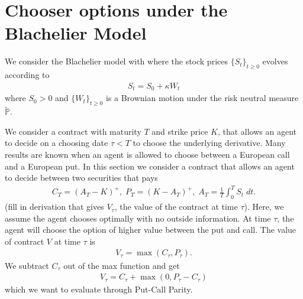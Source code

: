 \documentclass[reqno]{amsart}
\begin{document}
%
\begin{nouppercase}
\maketitle
\end{nouppercase}




\tableofcontents
\setcounter{part}{0}


\section{Chooser options under the Blachelier Model}
We consider the Blachelier model with where the stock prices $\{S_t\}_{t \ge 0}$ evolves according to 
\begin{align}
	 S_t = S_0 + \kappa W_t
\end{align}
where $S_0 > 0$ and $\{W_t\}_{t \ge 0}$ is a Brownian motion under the risk neutral measure $\tilde{\mathbb{P}}$.

We consider a contract with maturity $T$ and strike price $K$, that allows an agent to decide on a choosing date $\tau < T$ to choose the underlying derivative. Many results are known when an agent is allowed to choose between a European call and a European put. In this section we consider a contract that allows an agent to decide between two securities that pays 
\begin{align}
     C_T = (A_T - K)^+, \; P_T = (K - A_T)^+, \; A_T = \frac{1}{T} \int_0^T S_t \; dt.
\end{align}
(fill in derivation that gives $V_\tau$, the value of the contract at time $\tau$).
Here, we assume the agent chooses optimally with no outside information. At time $\tau$, the agent will choose the option of higher value between the put and call. The value of contract $V$ at time $\tau$ is 
\begin{align}
     V_\tau = \max(C_\tau, P_\tau).
\end{align}
We subtract $C_\tau$ out of the max function and get
\begin{align}
     V_\tau = C_\tau + \max(0, P_\tau - C_\tau)
\end{align}
which we want to evaluate through Put-Call Parity.
\end{document}
